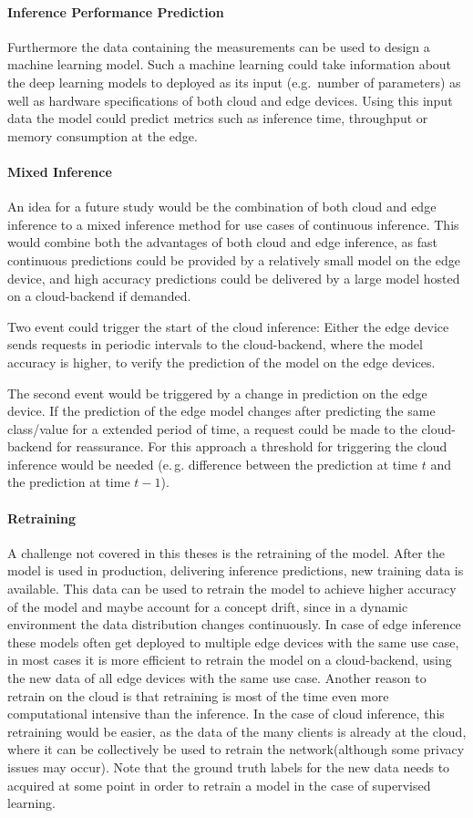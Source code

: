 \paragraph{Inference Performance Prediction}
Furthermore the data containing the measurements can be used to design a machine learning model.
Such a machine learning could take information about the deep learning models to deployed as its input (e.g.\, number of parameters) as well as hardware specifications of both cloud and edge devices.
Using this input data the model could predict metrics such as inference time, throughput or memory consumption at the edge.
\paragraph{Mixed Inference}
An idea for a future study would be the combination of both cloud and edge inference to a mixed inference method for use cases of continuous inference.
This would combine both the advantages of both cloud and edge inference, as fast continuous predictions could be provided by a relatively small model on the edge device, and high accuracy predictions could be delivered by a large model hosted on a cloud-backend if demanded. 

Two event could trigger the start of the cloud inference: 
Either the edge device sends requests in periodic intervals to the cloud-backend, where the model accuracy is higher, to verify the prediction of the model on the edge devices.

The second event would be triggered by a change in prediction on the edge device. If the prediction of the edge model changes after predicting the same class/value for a extended period of time, a request could be made to the cloud-backend for reassurance. For this approach a threshold for triggering the cloud inference would be needed (e.\,g. difference between the prediction at time $t$ and the prediction at time $t-1$).



\paragraph{Retraining}
A challenge not covered in this theses  is the retraining of the model. After the model is used in production, delivering inference predictions, new training data is available. This data can be used to retrain the model to achieve higher accuracy of the model and maybe account for a concept drift, since in a dynamic environment the data distribution changes continuously.
In case of edge inference these models often get deployed to multiple edge devices with the same use case, in most cases it is more efficient to retrain the model on a cloud-backend, using the new data of all edge devices with the same use case. Another reason to retrain on the cloud is that retraining is most of the time even more computational intensive than the inference.
In the case of cloud inference, this retraining would be easier, as the data of the many clients is already at the cloud, where it can be collectively be used to retrain the network(although some privacy issues may occur).
Note that the ground truth labels for the new data needs to acquired at some point in order to retrain a model in the case of supervised learning.
\endinput 

